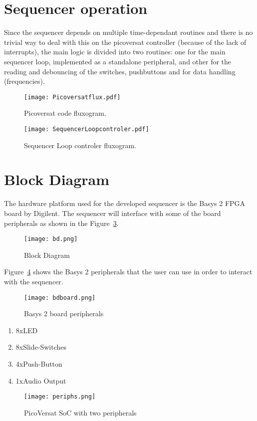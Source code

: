 
\section{Sequencer operation}

Since the sequencer depends on multiple time-dependant routines and there is no trivial way to deal with this on the picoversat controller (because of the lack of interrupts), the main logic is divided into two routines: one for the main sequencer loop, implemented as a standalone peripheral, and other for the reading and debouncing of the switches, pushbuttons and for data handling (frequencies).

\begin{figure}[!htbp]
  \centerline{\texttt{[image: Picoversatflux.pdf]}}
  \vspace{0cm}\caption{Picoversat code fluxogram.}
  \label{fig:bd}
\end{figure}

\begin{figure}[!htbp]
  \centerline{\texttt{[image: SequencerLoopcontroler.pdf]}}
  \vspace{0cm}\caption{Sequencer Loop controler fluxogram.}
  \label{fig:bd}
\end{figure}



\section{Block Diagram}

The hardware platform used for the developed sequencer is the Basys 2 FPGA board by Digilent. The sequencer will interface with some of the board peripherals as shown in the Figure~\ref{fig:bd}. 

\begin{figure}[!htbp]
    \centerline{\texttt{[image: bd.png]}}
    \vspace{0cm}\caption{Block Diagram}
    \label{fig:bd}
\end{figure}

Figure~\ref{fig:bdbasys2} shows the Basys 2 peripherals that the user can use in order to interact with the sequencer.

\begin{figure}[!htbp]
  \centerline{\texttt{[image: bdboard.png]}}
  \vspace{0cm}\caption{Basys 2 board peripherals}
  \label{fig:bdbasys2}
\end{figure}

\begin{enumerate}
	\item 8xLED
	\item 8xSlide-Switches
	\item 4xPush-Button
	\item 1xAudio Output
\end{enumerate}




\begin{figure}[!htbp]
    \centerline{\texttt{[image: periphs.png]}}
    \vspace{0cm}\caption{PicoVersat SoC with two peripherals}
    \label{fig:periphs}
\end{figure}